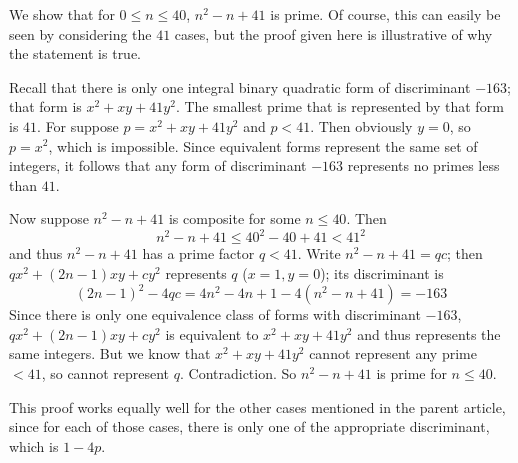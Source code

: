 \documentclass[12pt]{article}
\begin{document}
We show that for $0\leq n\leq 40$, $n^2-n+41$ is prime. Of course, this can easily be seen by considering the $41$ cases, but the proof given here is illustrative of why the statement is true.

Recall that there is only one  integral binary quadratic form of discriminant $-163$; that form is $x^2+xy+41y^2$. The smallest prime that is represented by that form is $41$. For suppose $p=x^2+xy+41y^2$ and $p<41$. Then obviously $y=0$, so $p=x^2$, which is impossible. Since equivalent forms represent the same set of integers, it follows that any form of discriminant $-163$ represents no primes less than $41$.

Now suppose $n^2-n+41$ is composite for some $n\leq 40$. Then
\[n^2-n+41\leq 40^2-40+41<41^2\]
and thus $n^2-n+41$ has a prime factor $q<41$. Write $n^2-n+41=qc$; then $qx^2+(2n-1)xy+cy^2$ represents $q$ ($x=1,y=0$); its discriminant is 
\[(2n-1)^2-4qc=4n^2-4n+1-4(n^2-n+41)=-163\]
Since there is only one equivalence class of forms with discriminant $-163$, $qx^2+(2n-1)xy+cy^2$ is equivalent to $x^2+xy+41y^2$ and thus represents the same integers. But we know that $x^2+xy+41y^2$ cannot represent any prime $<41$, so cannot represent $q$. Contradiction. So $n^2-n+41$ is prime for $n\leq 40$.

This proof works equally well for the other cases mentioned in the parent article, since for each of those cases, there is only one  of the appropriate discriminant, which is $1-4p$.
\end{document}
